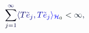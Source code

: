 \documentclass[12pt]{article}
\begin{document}
\makeatletter
\renewcommand*{\@textcolor}[3]{%
  \protect\leavevmode
  \begingroup
    \color#1{#2}#3%
  \endgroup
}
\makeatother
\begin{displaymath}
\mathcolor[RGB]{0,0,15}{\sum} _ { \mathcolor[RGB]{0,0,30}{j} \mathcolor[RGB]{0,0,45}{=} \mathcolor[RGB]{0,0,60}{1} } ^ { \mathcolor[RGB]{0,0,75}{\infty} } \mathcolor[RGB]{0,0,90}{\langle} \mathcolor[RGB]{0,0,105}{T} {\mathcolor[RGB]{0,0,120}{\tilde { \mathcolor[RGB]{0,0,135}{e} } }} _ { \mathcolor[RGB]{0,0,150}{j} } \mathcolor[RGB]{0,0,165}{,} \mathcolor[RGB]{0,0,180}{T} {\mathcolor[RGB]{0,0,195}{\tilde { \mathcolor[RGB]{0,0,210}{e} } }} _ { \mathcolor[RGB]{0,0,225}{j} } \mathcolor[RGB]{0,0,240}{\rangle} _ { \mathcal { \mathcolor[RGB]{0,0,255}{H} } _ { \mathcolor[RGB]{0,15,0}{0} } } \mathcolor[RGB]{0,15,15}{<} \mathcolor[RGB]{0,15,30}{\infty} \mathcolor[RGB]{0,15,45}{,}
\end{displaymath}
\end{document}
